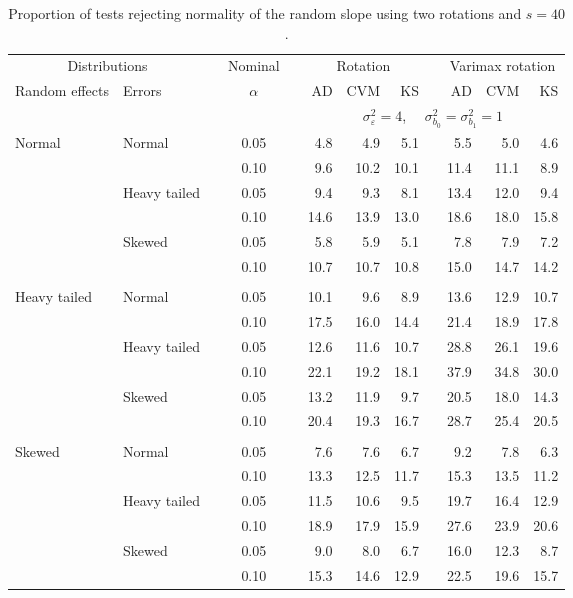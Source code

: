 \begin{table}[ht]
\centering
\caption{\label{tab:fixedsimb140} Proportion of tests rejecting normality of the random slope using two rotations and $s = 40$.}
\begin{scriptsize}
\begin{tabular}{ll p{.1cm} c p{.1cm} rrr p{.1cm} rrr}
  \hline
  \multicolumn{2}{c}{Distributions}& & Nominal & &  \multicolumn{3}{c}{Rotation} & & \multicolumn{3}{c}{Varimax rotation} \\ \cline{1-2} \cline{6-8} \cline{10-12}   
  Random effects & Errors & & $\alpha$ & & AD & CVM & KS & & AD & CVM & KS \\ 
   \hline
& && && \multicolumn{7}{c}{$\sigma_{\varepsilon}^2 = 4$, \ \ $\sigma_{b_0}^2 = \sigma_{b_1}^2 = 1$} \\ \cline{6-12}
\rowcolor{gray!20} Normal & Normal &  & 0.05 &  & 4.8 & 4.9 & 5.1 &  & 5.5 & 5.0 & 4.6 \\ 
\rowcolor{gray!20}    &  &  & 0.10 &  & 9.6 & 10.2 & 10.1 &  & 11.4 & 11.1 & 8.9 \\ 
\rowcolor{gray!20}    & Heavy tailed &  & 0.05 &  & 9.4 & 9.3 & 8.1 &  & 13.4 & 12.0 & 9.4 \\ 
\rowcolor{gray!20}    &  &  & 0.10 &  & 14.6 & 13.9 & 13.0 &  & 18.6 & 18.0 & 15.8 \\ 
\rowcolor{gray!20}    & Skewed &  & 0.05 &  & 5.8 & 5.9 & 5.1 &  & 7.8 & 7.9 & 7.2 \\ 
\rowcolor{gray!20}    &  &  & 0.10 &  & 10.7 & 10.7 & 10.8 &  & 15.0 & 14.7 & 14.2 \\ 
&&&&&&&&&&&\\
  Heavy tailed & Normal &  & 0.05 &  & 10.1 & 9.6 & 8.9 &  & 13.6 & 12.9 & 10.7 \\ 
   &  &  & 0.10 &  & 17.5 & 16.0 & 14.4 &  & 21.4 & 18.9 & 17.8 \\ 
   & Heavy tailed &  & 0.05 &  & 12.6 & 11.6 & 10.7 &  & 28.8 & 26.1 & 19.6 \\ 
   &  &  & 0.10 &  & 22.1 & 19.2 & 18.1 &  & 37.9 & 34.8 & 30.0 \\ 
   & Skewed &  & 0.05 &  & 13.2 & 11.9 & 9.7 &  & 20.5 & 18.0 & 14.3 \\ 
   &  &  & 0.10 &  & 20.4 & 19.3 & 16.7 &  & 28.7 & 25.4 & 20.5 \\ 
&&&&&&&&&&&\\
  Skewed & Normal &  & 0.05 &  & 7.6 & 7.6 & 6.7 &  & 9.2 & 7.8 & 6.3 \\ 
   &  &  & 0.10 &  & 13.3 & 12.5 & 11.7 &  & 15.3 & 13.5 & 11.2 \\ 
   & Heavy tailed &  & 0.05 &  & 11.5 & 10.6 & 9.5 &  & 19.7 & 16.4 & 12.9 \\ 
   &  &  & 0.10 &  & 18.9 & 17.9 & 15.9 &  & 27.6 & 23.9 & 20.6 \\ 
   & Skewed &  & 0.05 &  & 9.0 & 8.0 & 6.7 &  & 16.0 & 12.3 & 8.7 \\ 
   &  &  & 0.10 &  & 15.3 & 14.6 & 12.9 &  & 22.5 & 19.6 & 15.7 \\ 


\end{tabular}
\end{scriptsize}
\end{table}
